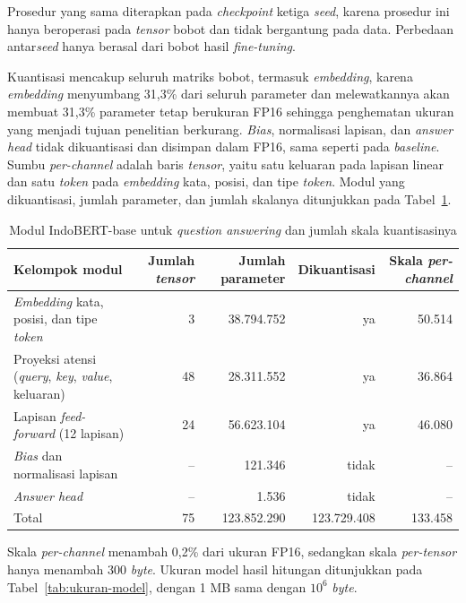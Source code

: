 Prosedur yang sama diterapkan pada \textit{checkpoint} ketiga \textit{seed}, karena prosedur ini hanya beroperasi pada \textit{tensor} bobot dan tidak bergantung pada data. Perbedaan antar\textit{seed} hanya berasal dari bobot hasil \textit{fine-tuning}.

Kuantisasi mencakup seluruh matriks bobot, termasuk \textit{embedding}, karena \textit{embedding} menyumbang 31,3\% dari seluruh parameter dan melewatkannya akan membuat 31,3\% parameter tetap berukuran FP16 sehingga penghematan ukuran yang menjadi tujuan penelitian berkurang. \textit{Bias}, normalisasi lapisan, dan \textit{answer head} tidak dikuantisasi dan disimpan dalam FP16, sama seperti pada \textit{baseline}. Sumbu \textit{per-channel} adalah baris \textit{tensor}, yaitu satu keluaran pada lapisan linear dan satu \textit{token} pada \textit{embedding} kata, posisi, dan tipe \textit{token}. Modul yang dikuantisasi, jumlah parameter, dan jumlah skalanya ditunjukkan pada Tabel~\ref{tab:modul-kuantisasi}.

\begin{table}[!ht]
  \centering
  \small
  \renewcommand{\arraystretch}{1.2}
  \caption{Modul IndoBERT-base untuk \textit{question answering} dan jumlah skala kuantisasinya}
  \label{tab:modul-kuantisasi}
  \begin{tabularx}{\textwidth}{@{}>{\raggedright\arraybackslash}Xrrrr@{}}
    \hline
    \textbf{Kelompok modul} & \textbf{Jumlah \textit{tensor}} & \textbf{Jumlah parameter} & \textbf{Dikuantisasi} & \textbf{Skala \textit{per-channel}} \\
    \hline
    \textit{Embedding} kata, posisi, dan tipe \textit{token} & 3 & 38.794.752 & ya & 50.514 \\
    Proyeksi atensi (\textit{query}, \textit{key}, \textit{value}, keluaran) & 48 & 28.311.552 & ya & 36.864 \\
    Lapisan \textit{feed-forward} (12 lapisan) & 24 & 56.623.104 & ya & 46.080 \\
    \textit{Bias} dan normalisasi lapisan & -- & 121.346 & tidak & -- \\
    \textit{Answer head} & -- & 1.536 & tidak & -- \\
    \hline
    Total & 75 & 123.852.290 & 123.729.408 & 133.458 \\
    \hline
  \end{tabularx}
\end{table}

Skala \textit{per-channel} menambah 0,2\% dari ukuran FP16, sedangkan skala \textit{per-tensor} hanya menambah 300 \textit{byte}. Ukuran model hasil hitungan ditunjukkan pada Tabel~\ref{tab:ukuran-model}, dengan 1 MB sama dengan $10^{6}$ \textit{byte}.

